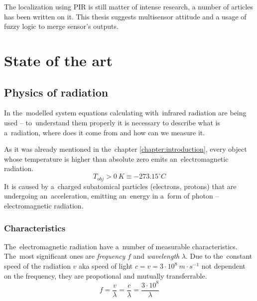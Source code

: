 The localization using PIR is still matter of intense research, a number of articles has been
written on it. This thesis suggests multisensor attitude and a usage of fuzzy logic to merge
sensor's outputs.










\chapter{State of the art}
\label{theory}


\section{Physics of radiation}

In the~modelled system equations calculating with~infrared radiation are being used -- to~understand
them properly it is necessary to describe what is a~radiation, where does it come from and how can
we measure it. 

As it was already mentioned in the~chapter \ref{chapter:introduction}, every object whose temperature
is higher than absolute zero emits an~electromagnetic radiation.
\begin{equation}
T_{obj}>0~K\equiv -273.15^{\circ}C
\end{equation}
It is caused by a~charged subatomical particles (electrons, protons) that are undergoing an~acceleration,
emitting an~energy in a~form of photon -- electromagnetic radiation.


\subsection*{Characteristics}
The~electromagnetic radiation have a~number of measurable characteristics. The~most significant ones
are {\it frequency} $f$ and {\it wavelength} $\lambda$. Due to the~constant speed of the radiation $v$
aka speed of light $c = v = 3\cdot10^{8}~m\cdot s^{-1}$ not dependent on the frequency, they are
propotional and mutually transferrable.
\begin{equation}
f=\frac{v}{\lambda}=\frac{c}{\lambda}=\frac{3\cdot10^{8}}{\lambda}
\end{equation}

